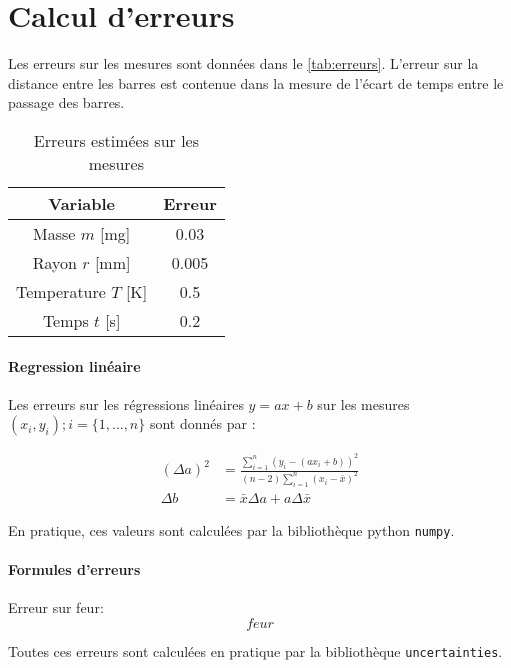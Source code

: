 \section{Calcul d'erreurs}
\label{sec:erreurs}

Les erreurs sur les mesures sont données dans le \autoref{tab:erreurs}. L'erreur sur la distance entre les barres est contenue dans la mesure de l'écart de temps entre le passage des barres.

\begin{table}[h]
    \centering
    \begin{tabulary}{\textwidth}{C C}
        \toprule
        Variable & Erreur \\
        \midrule
        Masse \(m\) [\si{\milli\gram}] & 0.03 \\
        Rayon \(r\) [\si{\milli\meter}] & 0.005 \\
        Temperature \(T\) [\si{\kelvin}] & 0.5 \\
        Temps \(t\) [\si{\second}] & 0.2 \\
        \bottomrule
    \end{tabulary}
    \caption{Erreurs estimées sur les mesures}
    \label{tab:erreurs}
\end{table}

\paragraph*{Regression linéaire}
Les erreurs sur les régressions linéaires \(y = ax + b\) sur les mesures \((x_i, y_i) ; i = \{1, \dots, n\}\) sont donnés par \cite{erreursmesure}:

\begin{equation}
    \label{eq:erreur:fit}
    \begin{aligned}
        (\Delta a)^2 &= \frac{\sum_{i=1}^{n}(y_i - (a x_i + b))^2}{(n-2) \sum_{i=1}^{n}(x_i - \bar{x})^2}\\
        \Delta b &= \bar{x} \Delta a + a \Delta \bar{x}
    \end{aligned}
\end{equation}

En pratique, ces valeurs sont calculées par la bibliothèque python \texttt{numpy}.

\paragraph*{Formules d'erreurs}

Erreur sur feur:
\begin{equation}
    feur
\end{equation}

Toutes ces erreurs sont calculées en pratique par la bibliothèque \texttt{uncertainties}.
